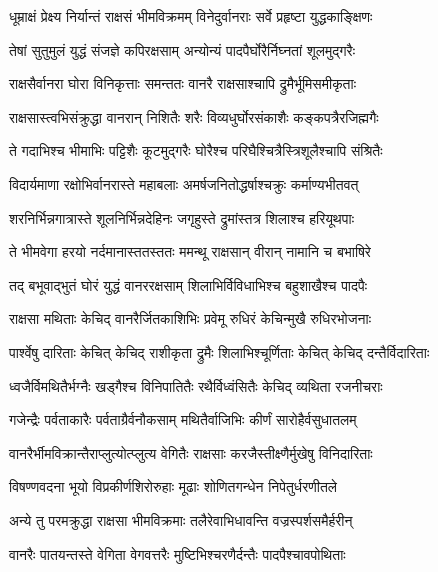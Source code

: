 
\twolineshloka
{धूम्राक्षं प्रेक्ष्य निर्यान्तं राक्षसं भीमविक्रमम्}
{विनेदुर्वानराः सर्वे प्रहृष्टा युद्धकाङ्क्षिणः} %

\twolineshloka
{तेषां सुतुमुलं युद्धं संजज्ञे कपिरक्षसाम्}
{अन्योन्यं पादपैर्घोरैर्निघ्नतां शूलमुद्गरैः} %

\twolineshloka
{राक्षसैर्वानरा घोरा विनिकृत्ताः समन्ततः}
{वानरै राक्षसाश्चापि द्रुमैर्भूमिसमीकृताः} %

\twolineshloka
{राक्षसास्त्वभिसंक्रुद्धा वानरान् निशितैः शरैः}
{विव्यधुर्घोरसंकाशैः कङ्कपत्रैरजिह्मगैः} %

\twolineshloka
{ते गदाभिश्च भीमाभिः पट्टिशैः कूटमुद्गरैः}
{घोरैश्च परिघैश्चित्रैस्त्रिशूलैश्चापि संश्रितैः} %

\twolineshloka
{विदार्यमाणा रक्षोभिर्वानरास्ते महाबलाः}
{अमर्षजनितोद्धर्षाश्चक्रुः कर्माण्यभीतवत्} %

\twolineshloka
{शरनिर्भिन्नगात्रास्ते शूलनिर्भिन्नदेहिनः}
{जगृहुस्ते द्रुमांस्तत्र शिलाश्च हरियूथपाः} %

\twolineshloka
{ते भीमवेगा हरयो नर्दमानास्ततस्ततः}
{ममन्थू राक्षसान् वीरान् नामानि च बभाषिरे} %

\twolineshloka
{तद् बभूवाद्भुतं घोरं युद्धं वानररक्षसाम्}
{शिलाभिर्विविधाभिश्च बहुशाखैश्च पादपैः} %

\twolineshloka
{राक्षसा मथिताः केचिद् वानरैर्जितकाशिभिः}
{प्रवेमू रुधिरं केचिन्मुखै रुधिरभोजनाः} %

\twolineshloka
{पार्श्वेषु दारिताः केचित् केचिद् राशीकृता द्रुमैः}
{शिलाभिश्चूर्णिताः केचित् केचिद् दन्तैर्विदारिताः} %

\twolineshloka
{ध्वजैर्विमथितैर्भग्नैः खड्गैश्च विनिपातितैः}
{रथैर्विध्वंसितैः केचिद् व्यथिता रजनीचराः} %

\twolineshloka
{गजेन्द्रैः पर्वताकारैः पर्वताग्रैर्वनौकसाम्}
{मथितैर्वाजिभिः कीर्णं सारोहैर्वसुधातलम्} %

\twolineshloka
{वानरैर्भीमविक्रान्तैराप्लुत्योत्प्लुत्य वेगितैः}
{राक्षसाः करजैस्तीक्ष्णैर्मुखेषु विनिदारिताः} %

\twolineshloka
{विषण्णवदना भूयो विप्रकीर्णशिरोरुहाः}
{मूढाः शोणितगन्धेन निपेतुर्धरणीतले} %

\twolineshloka
{अन्ये तु परमक्रुद्धा राक्षसा भीमविक्रमाः}
{तलैरेवाभिधावन्ति वज्रस्पर्शसमैर्हरीन्} %

\twolineshloka
{वानरैः पातयन्तस्ते वेगिता वेगवत्तरैः}
{मुष्टिभिश्चरणैर्दन्तैः पादपैश्चावपोथिताः} %

